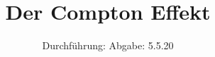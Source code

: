 

\subject{V603}
\title{Der Compton Effekt}
\date{%
  Durchführung: 
  \hspace{3em}
  Abgabe: 5.5.20
}



\maketitle
\thispagestyle{empty}
\tableofcontents
\newpage








\printbibliography{}


